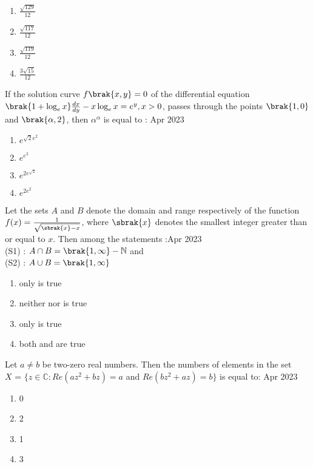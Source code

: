 \begin{enumerate}
        \item $\frac{\sqrt{129}}{12}$ 
        \item $\frac{\sqrt{117}}{12}$
 \item $\frac{\sqrt{119}}{12}$ 
        \item $\frac{3\sqrt{15}}{12}$
\end{enumerate}
\item If the solution curve $f\brak{x, y} = 0$ of the differential equation $\brak{1+ \log_e x}\frac{dx}{dy} - x \log_e x =e^y, x>0$, passes through the points $\brak{1, 0}$ and $\brak{\alpha,2}$, then $\alpha ^{\alpha}$ is equal to : \hfill{Apr 2023}
        \begin{enumerate}
                \item $e^{\sqrt{2}e^2}$
                \item $e^{e^2}$
                \item $e^{2e^{\sqrt{2}}}$ 
        \item $e^{2e^2}$    
\end{enumerate}
\item Let the sets $A$ and $B$ denote the domain and range respectively of the function $f(x)=\frac{1}{\sqrt{\sbrak{x}-x}}$, where $\sbrak{x}$ denotes the smallest integer greater than or equal to $x$. Then among the statements :\hfill{Apr 2023} \\
	(S1) : $A \cap B = \brak{1,\infty} - \mathbb{N}$ and \\
(S2) : $A \cup B = \brak{1,\infty}$
 \begin{enumerate}
	 \item only  is true
	 \item neither  nor  is true
	 \item only  is true
	 \item both  and  are true
\end{enumerate}
\item Let $a \neq b$ be two-zero real numbers. Then the numbers of elements in the set \\ $X$ = $\{$$z \in \mathbb{C}:Re(az^2+bz)=a$  and $Re(bz^2+az)=b$$\}$ is equal to: \hfill{Apr 2023}
\begin{enumerate}
                \item 0
                \item 2
                \item 1
                \item 3
\end{enumerate}

